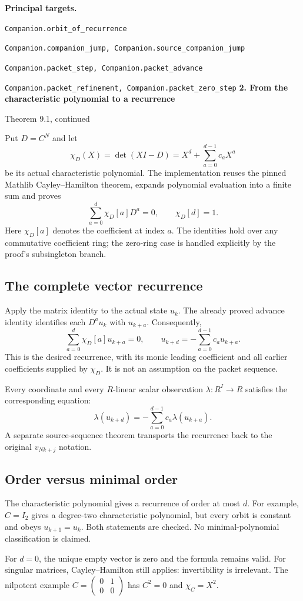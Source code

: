 \documentclass[11pt]{article}
\newcommand{\target}[1]{{\footnotesize\texttt{#1}}}
\newcommand{\pageheading}[2]{{\Large\bfseries\color{ink}#1}\par{\small #2}\par\medskip}
\begin{document}
\textbf{Principal targets.}\par
\target{Companion.orbit\_of\_recurrence}\par
\target{Companion.companion\_jump, Companion.source\_companion\_jump}\par
\target{Companion.packet\_step, Companion.packet\_advance}\par
\target{Companion.packet\_refinement, Companion.packet\_zero\_step}
\newpage
\pageheading{2. From the characteristic polynomial to a recurrence}{Theorem 9.1, continued}
Put $D=C^N$ and let
\[
 \chi_D(X)=\det(XI-D)=X^d+\sum_{a=0}^{d-1}c_aX^a
\]
be its actual characteristic polynomial. The implementation reuses the pinned Mathlib Cayley--Hamilton theorem, expands polynomial evaluation into a finite sum and proves
\[
 \sum_{a=0}^{d}\chi_D[a]D^a=0,
 \qquad \chi_D[d]=1.
\]
Here $\chi_D[a]$ denotes the coefficient at index $a$. The identities hold over any commutative coefficient ring; the zero-ring case is handled explicitly by the proof's subsingleton branch.

\subsection*{The complete vector recurrence}
Apply the matrix identity to the actual state $u_k$. The already proved advance identity identifies each $D^a u_k$ with $u_{k+a}$. Consequently,
\[
 \sum_{a=0}^{d}\chi_D[a]u_{k+a}=0,
 \qquad
 \boxed{u_{k+d}=-\sum_{a=0}^{d-1}c_a u_{k+a}.}
\]
This is the desired recurrence, with its monic leading coefficient and all earlier coefficients supplied by $\chi_D$. It is not an assumption on the packet sequence.

Every coordinate and every $R$-linear scalar observation $\lambda:R^I\to R$ satisfies the corresponding equation:
\[
 \lambda(u_{k+d})=-\sum_{a=0}^{d-1}c_a\lambda(u_{k+a}).
\]
A separate source-sequence theorem transports the recurrence back to the original $v_{Nk+j}$ notation.

\subsection*{Order versus minimal order}
The characteristic polynomial gives a recurrence of order at most $d$. For example, $C=I_2$ gives a degree-two characteristic polynomial, but every orbit is constant and obeys $u_{k+1}=u_k$. Both statements are checked. No minimal-polynomial classification is claimed.

For $d=0$, the unique empty vector is zero and the formula remains valid. For singular matrices, Cayley--Hamilton still applies: invertibility is irrelevant. The nilpotent example $C=\left(\begin{smallmatrix}0&1\\0&0\end{smallmatrix}\right)$ has $C^2=0$ and $\chi_C=X^2$.
\end{document}
